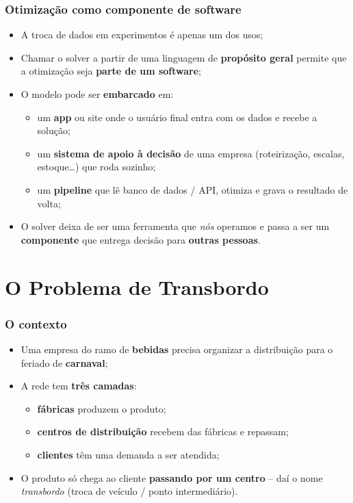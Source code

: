 \documentclass[fleqn]{beamer}
\begin{document}
\begin{frame}
	\frametitle{Otimização como componente de software}
	\begin{itemize}
		\item A troca de dados em experimentos é apenas um dos usos;
		\item Chamar o solver a partir de uma linguagem de \textbf{propósito
			geral} permite que a otimização seja \textbf{parte de um
			software};
		\item O modelo pode ser \textbf{embarcado} em:
		\begin{itemize}
			\item um \textbf{app} ou site onde o usuário final entra com
				os dados e recebe a solução;
			\item um \textbf{sistema de apoio à decisão} de uma empresa
				(roteirização, escalas, estoque\dots) que roda sozinho;
			\item um \textbf{pipeline} que lê banco de dados / API,
				otimiza e grava o resultado de volta;
		\end{itemize}
		\item O solver deixa de ser uma ferramenta que \emph{nós}
			operamos e passa a ser um \textbf{componente} que entrega
			decisão para \textbf{outras pessoas}.
	\end{itemize}
\end{frame}

\section{O Problema de Transbordo}

\begin{frame}
	\frametitle{O contexto}
	\begin{itemize}
		\item Uma empresa do ramo de \textbf{bebidas} precisa organizar a
			distribuição para o feriado de \textbf{carnaval};
		\item A rede tem \textbf{três camadas}:
		\begin{itemize}
			\item \textbf{fábricas} produzem o produto;
			\item \textbf{centros de distribuição} recebem das fábricas e
				repassam;
			\item \textbf{clientes} têm uma demanda a ser atendida;
		\end{itemize}
		\item O produto só chega ao cliente \textbf{passando por um
			centro} -- daí o nome \emph{transbordo} (troca de veículo /
			ponto intermediário).
	\end{itemize}
\end{frame}
\end{document}
